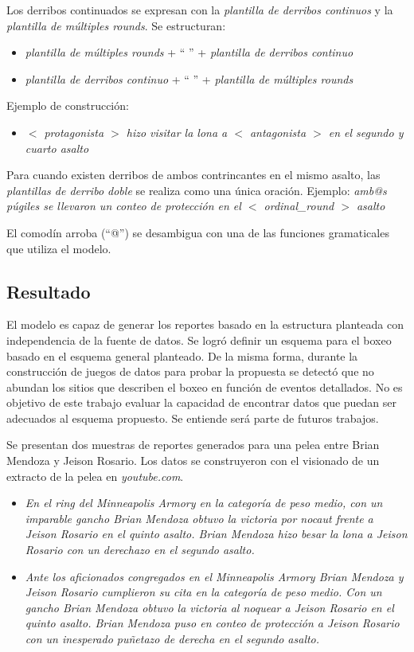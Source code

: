     Los derribos continuados se expresan con la \textit{plantilla de derribos continuos}  y la \textit{plantilla de múltiples rounds}.
    Se estructuran:
    \begin{itemize}
        \item \textit{plantilla de múltiples rounds} + “ ” + \textit{plantilla de derribos continuo}
        \item \textit{plantilla de derribos continuo} + “ ” + \textit{plantilla de múltiples rounds} 
    \end{itemize}
    Ejemplo de construcción:
    \begin{itemize}
        \item \textit{ $<$ protagonista $>$ hizo visitar la lona a $<$ antagonista $>$ en el segundo y cuarto asalto}
    \end{itemize}

    Para cuando existen derribos de ambos contrincantes en el mismo asalto, las \textit{plantillas de derribo doble} se realiza como 
una única oración.
    Ejemplo: \textit{amb@s púgiles se llevaron un conteo de protección en el $<$ ordinal\_round $>$ asalto}

    El comodín arroba (“@”) se desambigua con una de las funciones gramaticales que utiliza el modelo. 

\subsection{Resultado}

    El modelo es capaz de generar los reportes basado en la estructura planteada con independencia de la fuente de datos. 
Se logró definir un esquema para el boxeo basado en el esquema general planteado. De la misma forma, durante la construcción de juegos 
de datos para probar la propuesta se detectó que no abundan los sitios que describen el boxeo en función de eventos detallados. No es 
objetivo de este trabajo evaluar la capacidad de encontrar datos que puedan ser adecuados al esquema propuesto. Se entiende será parte de 
futuros trabajos.

    Se presentan dos muestras de reportes generados para una pelea entre Brian Mendoza y Jeison Rosario. Los datos se construyeron con el 
visionado de un extracto de la pelea en \textit{youtube.com}.

    \begin{itemize}
        \item \textit{En el ring del Minneapolis Armory en la categoría de peso medio, con un imparable gancho Brian Mendoza obtuvo la victoria por nocaut frente 
        a Jeison Rosario en el quinto asalto.
        Brian Mendoza hizo besar la lona a Jeison Rosario con un derechazo en el segundo asalto.}
        \item \textit{Ante los aficionados congregados en el Minneapolis Armory Brian Mendoza y Jeison Rosario cumplieron su cita en la categoría 
        de peso medio. Con un gancho Brian Mendoza obtuvo la victoria al noquear a Jeison Rosario en el quinto asalto.
        Brian Mendoza puso en conteo de protección a Jeison Rosario con un inesperado puñetazo de derecha en el segundo asalto.}
    \end{itemize}